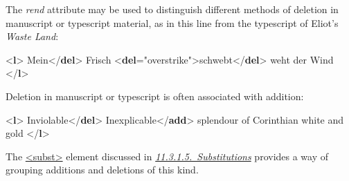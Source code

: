 The {\itshape rend} attribute may be used to distinguish different methods of deletion in manuscript or typescript material, as in this line from the typescript of Eliot's \textit{Waste Land}: \par\bgroup{}\exampleFont \begin{shaded}\noindent\mbox{}{<\textbf{l}>}\mbox{}\newline 
{}Mein{</\textbf{del}>} Frisch\mbox{}\newline 
{<\textbf{del}\hspace*{1em}{type}="{overstrike}">}schwebt{</\textbf{del}>} weht der Wind\mbox{}\newline 
{</\textbf{l}>}\end{shaded}\egroup\par \par
Deletion in manuscript or typescript is often associated with addition: \par\bgroup{}\exampleFont \begin{shaded}\noindent\mbox{}{<\textbf{l}>}\mbox{}\newline 
{}Inviolable{</\textbf{del}>}\mbox{}\newline 
{}Inexplicable{</\textbf{add}>}\mbox{}\newline 
 splendour of Corinthian white and gold\mbox{}\newline 
{</\textbf{l}>}\end{shaded}\egroup\par \noindent  The \hyperref[TEI.subst]{<subst>} element discussed in \textit{\hyperref[PHSU]{11.3.1.5.\ Substitutions}} provides a way of grouping additions and deletions of this kind.\par
